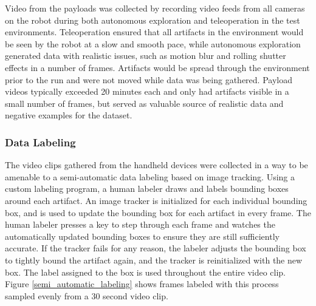 Video from the payloads was collected by recording video feeds from all cameras on the robot during both autonomous exploration and teleoperation in the test environments. Teleoperation ensured that all artifacts in the environment would be seen by the robot at a slow and smooth pace, while autonomous exploration generated data with realistic issues, such as motion blur and rolling shutter effects in a number of frames. Artifacts would be spread through the environment prior to the run and were not moved while data was being gathered. Payload videos typically exceeded 20 minutes each and only had artifacts visible in a small number of frames, but served as valuable source of realistic data and negative examples for the dataset.

\subsubsection{Data Labeling}

The video clips gathered from the handheld devices were collected in a way to be amenable to a semi-automatic data labeling based on image tracking. Using a custom labeling program, a human labeler draws and labels bounding boxes around each artifact. An image tracker is initialized for each individual bounding box, and is used to update the bounding box for each artifact in every frame. The human labeler presses a key to step through each frame and watches the automatically updated bounding boxes to ensure they are still sufficiently accurate. If the tracker fails for any reason, the labeler adjusts the bounding box to tightly bound the artifact again, and the tracker is reinitialized with the new box. The label assigned to the box is used throughout the entire video clip. Figure \ref{semi_automatic_labeling} shows frames labeled with this process sampled evenly from a 30 second video clip.


